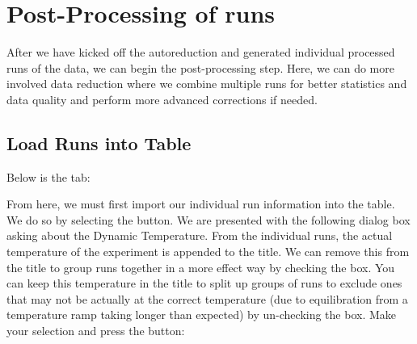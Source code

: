 \section{Post-Processing of runs}

After we have kicked off the autoreduction and generated individual processed runs of the data, we can begin the post-processing step. Here, we can do more involved data reduction where we combine multiple runs for better statistics and data quality and perform more advanced corrections if needed.

\subsection{Load Runs into Table}

Below is the  tab: 

\noindent{}

From here, we must first import our individual run information into the table. We do so by selecting the  button. We are presented with the following dialog box asking about the Dynamic Temperature. From the individual runs, the actual temperature of the experiment is appended to the title. We can remove this from the title to group runs together in a more effect way by checking the box. You can keep this temperature in the title to split up groups of runs to exclude ones that may not be actually at the correct temperature (due to equilibration from a temperature ramp taking longer than expected) by un-checking the box. Make your selection and press the  button:

